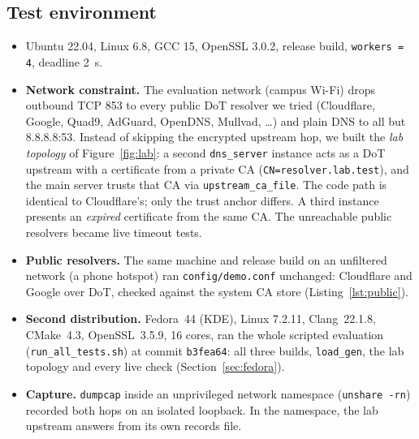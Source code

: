 \documentclass[11pt,a4paper]{article}
\newcommand{\code}[1]{\texttt{#1}}
\begin{document}
\subsection{Test environment}
\begin{itemize}
  \item Ubuntu 22.04, Linux 6.8, GCC 15, OpenSSL 3.0.2, release build, \code{workers = 4}, deadline 2~s.
  \item \textbf{Network constraint.} The evaluation network (campus Wi-Fi) drops outbound TCP 853 to every
  public DoT resolver we tried (Cloudflare, Google, Quad9, AdGuard, OpenDNS, Mullvad, \ldots) and plain DNS to
  all but 8.8.8.8:53. Instead of skipping the encrypted upstream hop, we built the \emph{lab topology} of
  Figure~\ref{fig:lab}: a second \code{dns\_server} instance acts as a DoT upstream with a certificate from a
  private CA (\code{CN=resolver.lab.test}), and the main server trusts that CA via \code{upstream\_ca\_file}. The
  code path is identical to Cloudflare's; only the trust anchor differs. A third instance presents an
  \emph{expired} certificate from the same CA. The unreachable public resolvers became live timeout tests.
  \item \textbf{Public resolvers.} The same machine and release build on an unfiltered network (a phone
  hotspot) ran \code{config/demo.conf} unchanged: Cloudflare and Google over DoT, checked against the system CA
  store (Listing~\ref{lst:public}).
  \item \textbf{Second distribution.} Fedora~44 (KDE), Linux 7.2.11, Clang~22.1.8, CMake~4.3, OpenSSL~3.5.9,
  16 cores, ran the whole scripted evaluation (\code{run\_all\_tests.sh}) at commit \code{b3fea64}: all three
  builds, \code{load\_gen}, the lab topology and every live check (Section~\ref{sec:fedora}).
  \item \textbf{Capture.} \code{dumpcap} inside an unprivileged network namespace (\code{unshare -rn}) recorded
  both hops on an isolated loopback. In the namespace, the lab upstream answers from its own records file.
\end{itemize}
\end{document}
